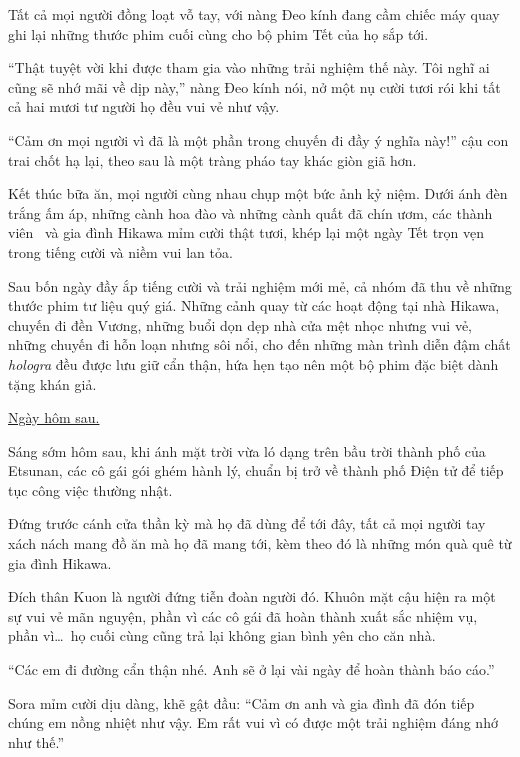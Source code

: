 \documentclass[../main.tex]{subfiles}
\begin{document}
Tất cả mọi người đồng loạt vỗ tay, với nàng Đeo kính đang cầm chiếc máy quay ghi lại những thước phim cuối cùng cho bộ phim Tết của họ sắp tới.

``Thật tuyệt vời khi được tham gia vào những trải nghiệm thế này. Tôi nghĩ ai cũng sẽ nhớ mãi về dịp này,'' nàng Đeo kính nói, nở một nụ cười tươi rói khi tất cả hai mươi tư người họ đều vui vẻ như vậy.

``Cảm ơn mọi người vì đã là một phần trong chuyến đi đầy ý nghĩa này!'' cậu con trai chốt hạ lại, theo sau là một tràng pháo tay khác giòn giã hơn.

Kết thúc bữa ăn, mọi người cùng nhau chụp một bức ảnh kỷ niệm. Dưới ánh đèn trắng ấm áp, những cành hoa đào và những cành quất đã chín ươm, các thành viên \hll\ và gia đình Hikawa mỉm cười thật tươi, khép lại một ngày Tết trọn vẹn trong tiếng cười và niềm vui lan tỏa.

\il

Sau bốn ngày đầy ắp tiếng cười và trải nghiệm mới mẻ, cả nhóm đã thu về những thước phim tư liệu quý giá. Những cảnh quay từ các hoạt động tại nhà Hikawa, chuyến đi đền Vương, những buổi dọn dẹp nhà cửa mệt nhọc nhưng vui vẻ, những chuyến đi hỗn loạn nhưng sôi nổi, cho đến những màn trình diễn đậm chất \textit{hologra} đều được lưu giữ cẩn thận, hứa hẹn tạo nên một bộ phim đặc biệt dành tặng khán giả.

\begin{center}
    \uline{Ngày hôm sau.}
\end{center}

Sáng sớm hôm sau, khi ánh mặt trời vừa ló dạng trên bầu trời thành phố của Etsunan, các cô gái gói ghém hành lý, chuẩn bị trở về thành phố Điện tử để tiếp tục công việc thường nhật.

Đứng trước cánh cửa thần kỳ mà họ đã dùng để tới đây, tất cả mọi người tay xách nách mang đồ ăn mà họ đã mang tới, kèm theo đó là những món quà quê từ gia đình Hikawa.

Đích thân Kuon là người đứng tiễn đoàn người đó. Khuôn mặt cậu hiện ra một sự vui vẻ mãn nguyện, phần vì các cô gái đã hoàn thành xuất sắc nhiệm vụ, phần vì\dots\ họ cuối cùng cũng trả lại không gian bình yên cho căn nhà.

``Các em đi đường cẩn thận nhé. Anh sẽ ở lại vài ngày để hoàn thành báo cáo.''

Sora mỉm cười dịu dàng, khẽ gật đầu: ``Cảm ơn anh và gia đình đã đón tiếp chúng em nồng nhiệt như vậy. Em rất vui vì có được một trải nghiệm đáng nhớ như thế.''
\end{document}
